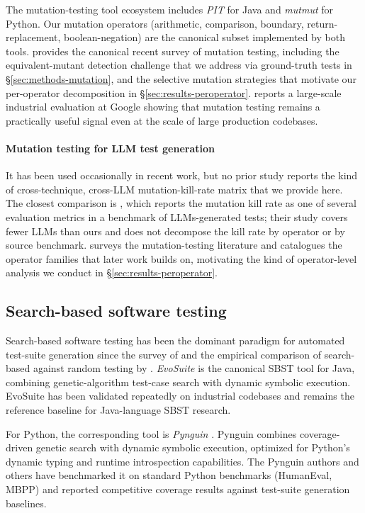 \documentclass[smallextended]{svjour3}
\begin{document}
The mutation-testing tool ecosystem includes \textit{PIT} for Java
\citep{coles2016} and \textit{mutmut} for Python. Our mutation
operators (arithmetic, comparison, boundary, return-replacement,
boolean-negation) are the canonical subset implemented by both
tools. \citet{papadakis2019survey} provides the canonical recent survey of
mutation testing, including the equivalent-mutant detection
challenge that we address via ground-truth tests in
\S\ref{sec:methods-mutation}, and the selective mutation strategies
that motivate our per-operator decomposition in
\S\ref{sec:results-peroperator}. \citet{petrovic2018} reports a
large-scale industrial evaluation at Google showing that mutation
testing remains a practically useful signal even at the scale of
large production codebases.

\paragraph{Mutation testing for LLM test generation}
It has been used occasionally in recent work, but no prior study reports
the kind of cross-technique, cross-LLM mutation-kill-rate matrix that
we provide here. The closest comparison is
\citet{wang2026mutationstudy}, which reports the mutation kill rate as one
of several evaluation metrics in a benchmark of LLMs-generated tests;
their study covers fewer LLMs than ours and does not decompose the
kill rate by operator or by source benchmark.
\citet{papadakis2019survey} surveys the mutation-testing literature and catalogues the operator families that later work builds on, motivating the
kind of operator-level analysis we conduct in
\S\ref{sec:results-peroperator}.

\subsection{Search-based software testing}\label{sec:related-sbst}

Search-based software testing has been the dominant paradigm for
automated test-suite generation since the survey of
\citet{mcminn2004} and the empirical comparison of search-based
against random testing by \citet{harman2010}. \emph{EvoSuite} \citep{fraser2011,fraser2013}
is the canonical SBST tool for Java, combining genetic-algorithm
test-case search with dynamic symbolic execution. EvoSuite has been
validated repeatedly on industrial codebases \citep{almasi2017} and
remains the reference baseline for Java-language SBST research.

For Python, the corresponding tool is \emph{Pynguin}
\citep{lukasczyk2023empirical,lukasczyk2022}. Pynguin combines
coverage-driven genetic search with dynamic symbolic execution,
optimized for Python's dynamic typing and runtime introspection
capabilities. The Pynguin authors and others have benchmarked it on
standard Python benchmarks (HumanEval, MBPP) and reported
competitive coverage results against test-suite
generation baselines.
\end{document}
